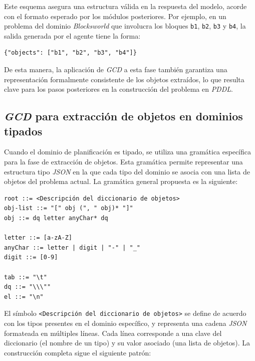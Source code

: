 Este esquema asegura una estructura válida en la respuesta del modelo, acorde con el formato esperado por los módulos posteriores. Por ejemplo, en un problema del dominio \textit{Blocksworld} que involucra los bloques \texttt{b1}, \texttt{b2}, \texttt{b3} y \texttt{b4}, la salida generada por el agente tiene la forma:

\begin{tcolorbox}[colback=white, colframe=gray, title=Ejemplo de salida válida (no tipado), fonttitle=\bfseries, breakable]
\small
\begin{verbatim}
{"objects": ["b1", "b2", "b3", "b4"]}
\end{verbatim}
\end{tcolorbox}

De esta manera, la aplicación de \textit{GCD} a esta fase también garantiza una representación formalmente consistente de los objetos extraídos, lo que resulta clave para los pasos posteriores en la construcción del problema en \textit{PDDL}.

\subsection{\textit{GCD} para extracción de objetos en dominios tipados}

Cuando el dominio de planificación es tipado, se utiliza una gramática específica para la fase de extracción de objetos. Esta gramática permite representar una estructura tipo \textit{JSON} en la que cada tipo del dominio se asocia con una lista de objetos del problema actual. La gramática general propuesta es la siguiente:

\begin{tcolorbox}[colback=blue!5!white, colframe=blue!75!black, title=Gramática para extracción de objetos (dominios tipados), fonttitle=\bfseries, breakable]
\small
\begin{verbatim}
root ::= <Descripción del diccionario de objetos>
obj-list ::= "[" obj (", " obj)* "]"
obj ::= dq letter anyChar* dq

letter ::= [a-zA-Z]
anyChar ::= letter | digit | "-" | "_"
digit ::= [0-9]

tab ::= "\t"
dq ::= "\\\""
el ::= "\n"
\end{verbatim}
\end{tcolorbox}

El símbolo \texttt{<Descripción del diccionario de objetos>} se define de acuerdo con los tipos presentes en el dominio específico, y representa una cadena \textit{JSON} formateada en múltiples líneas. Cada línea corresponde a una clave del diccionario (el nombre de un tipo) y su valor asociado (una lista de objetos). La construcción completa sigue el siguiente patrón:

